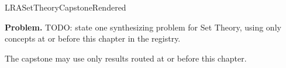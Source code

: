 \ifcsname LRASetTheoryCapstoneRendered\endcsname
\else
\expandafter\gdef\csname LRASetTheoryCapstoneRendered\endcsname{}

\newpage
{}
\label{cap:set-theory}

\begin{tcolorbox}[
  colback=gray!6,
  colframe=gray!40,
  arc=2pt,
  left=8pt, right=8pt, top=6pt, bottom=6pt,
  title={\small\textbf{Capstone Problem}},
  fonttitle=\small\bfseries
]
\textbf{Problem.}
TODO: state one synthesizing problem for Set Theory, using only concepts at or
before this chapter in the registry.
\end{tcolorbox}

\begin{remark*}
The capstone may use only results routed at or before this chapter.
\end{remark*}

\clearpage
\fi
